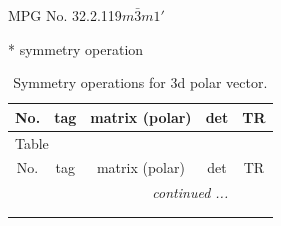 \documentclass[fleqn,8pt]{jsarticle}
\begin{document}
\setcounter{MaxMatrixCols}{32}

\renewcommand{\tablename}{Table~}
\renewcommand{\figurename}{Figure~}
\begin{center}
\LARGE
MPG No. 32.2.119\quad$m\bar{3}m1'$
\end{center}
* symmetry operation
\renewcommand{\arraystretch}{1.3}
\begin{longtable}{ccccc}
\caption{Symmetry operations for 3d polar vector.}
 \\
 \hline \hline
No. & tag & matrix (polar) & det & TR \\ \hline \endfirsthead

\multicolumn{4}{l}{\tablename\ \thetable{}} \\
 \hline \hline
No. & tag & matrix (polar) & det & TR \\ \hline \endhead

 \hline \hline
\multicolumn{4}{r}{\footnotesize\it continued ...} \\ \endfoot

 \hline \hline
\multicolumn{4}{r}{} \\ \endlastfoot


\end{longtable}
\end{document}

